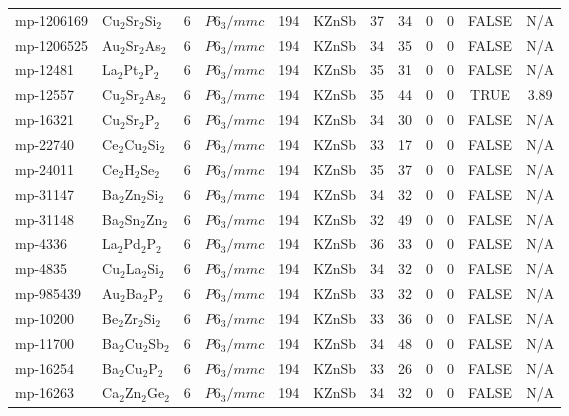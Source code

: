 {\begin{longtable}{llcccccccccc}
    mp-1206169 & Cu$_{2}$Sr$_{2}$Si$_{2}$ & 6     & $P6_3/mmc$ & 194   & KZnSb & 37    & 34    & 0     & 0     & FALSE & N/A \\
    mp-1206525 & Au$_{2}$Sr$_{2}$As$_{2}$ & 6     & $P6_3/mmc$ & 194   & KZnSb & 34    & 35    & 0     & 0     & FALSE & N/A \\
    mp-12481 & La$_{2}$Pt$_{2}$P$_{2}$ & 6     & $P6_3/mmc$ & 194   & KZnSb & 35    & 31    & 0     & 0     & FALSE & N/A \\
    mp-12557 & Cu$_{2}$Sr$_{2}$As$_{2}$ & 6     & $P6_3/mmc$ & 194   & KZnSb & 35    & 44    & 0     & 0     & TRUE  & 3.89  \\
    mp-16321 & Cu$_{2}$Sr$_{2}$P$_{2}$ & 6     & $P6_3/mmc$ & 194   & KZnSb & 34    & 30    & 0     & 0     & FALSE & N/A \\
    mp-22740 & Ce$_{2}$Cu$_{2}$Si$_{2}$ & 6     & $P6_3/mmc$ & 194   & KZnSb & 33    & 17    & 0     & 0     & FALSE & N/A \\
    mp-24011 & Ce$_{2}$H$_{2}$Se$_{2}$ & 6     & $P6_3/mmc$ & 194   & KZnSb & 35    & 37    & 0     & 0     & FALSE & N/A \\
    mp-31147 & Ba$_{2}$Zn$_{2}$Si$_{2}$ & 6     & $P6_3/mmc$ & 194   & KZnSb & 34    & 32    & 0     & 0     & FALSE & N/A \\
    mp-31148 & Ba$_{2}$Sn$_{2}$Zn$_{2}$ & 6     & $P6_3/mmc$ & 194   & KZnSb & 32    & 49    & 0     & 0     & FALSE & N/A \\
    mp-4336 & La$_{2}$Pd$_{2}$P$_{2}$ & 6     & $P6_3/mmc$ & 194   & KZnSb & 36    & 33    & 0     & 0     & FALSE & N/A \\
    mp-4835 & Cu$_{2}$La$_{2}$Si$_{2}$ & 6     & $P6_3/mmc$ & 194   & KZnSb & 34    & 32    & 0     & 0     & FALSE & N/A \\
    mp-985439 & Au$_{2}$Ba$_{2}$P$_{2}$ & 6     & $P6_3/mmc$ & 194   & KZnSb & 33    & 32    & 0     & 0     & FALSE & N/A \\
    mp-10200 & Be$_{2}$Zr$_{2}$Si$_{2}$ & 6     & $P6_3/mmc$ & 194   & KZnSb & 33    & 36    & 0     & 0     & FALSE & N/A \\
    mp-11700 & Ba$_{2}$Cu$_{2}$Sb$_{2}$ & 6     & $P6_3/mmc$ & 194   & KZnSb & 34    & 48    & 0     & 0     & FALSE & N/A \\
    mp-16254 & Ba$_{2}$Cu$_{2}$P$_{2}$ & 6     & $P6_3/mmc$ & 194   & KZnSb & 33    & 26    & 0     & 0     & FALSE & N/A \\
    mp-16263 & Ca$_{2}$Zn$_{2}$Ge$_{2}$ & 6     & $P6_3/mmc$ & 194   & KZnSb & 34    & 32    & 0     & 0     & FALSE & N/A \\

\end{longtable}}
